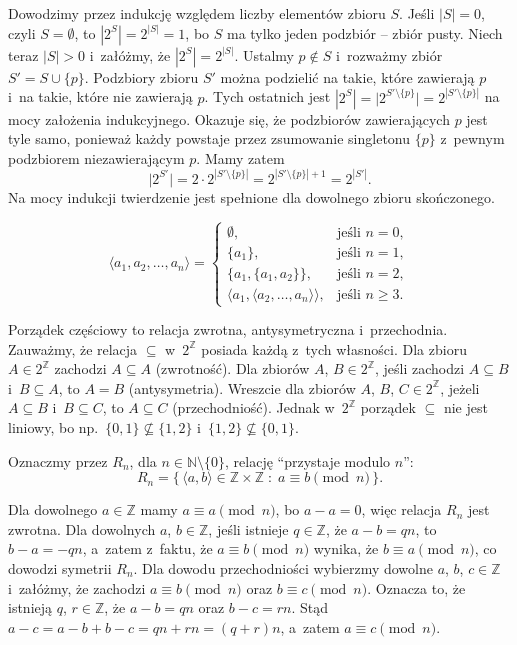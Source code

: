 \exercise %
Dowodzimy przez indukcję względem liczby elementów zbioru $S$. Jeśli $|S|=0$, czyli $S=\emptyset$, to $|2^S|=2^{|S|}=1$, bo $S$ ma tylko jeden podzbiór -- zbiór pusty. Niech teraz $|S|>0$ i~załóżmy, że $|2^S|=2^{|S|}$. Ustalmy $p\notin S$ i~rozważmy zbiór $S'=S\cup\{p\}$. Podzbiory zbioru $S'$ można podzielić na takie, które zawierają $p$ i~na takie, które nie zawierają $p$. Tych ostatnich jest $|2^S|=\bigl|2^{S'\setminus\{p\}}\bigr|=2^{|S'\setminus\{p\}|}$ na mocy założenia indukcyjnego. Okazuje się, że podzbiorów zawierających $p$ jest tyle samo, ponieważ każdy powstaje przez zsumowanie singletonu $\{p\}$ z~pewnym podzbiorem niezawierającym $p$. Mamy zatem
\[
	\bigl|2^{S'}\bigr|=2\cdot2^{|S'\setminus\{p\}|} = 2^{|S'\setminus\{p\}|+1} = 2^{|S'|}.
\]
Na mocy indukcji twierdzenie jest spełnione dla dowolnego zbioru skończonego.

\exercise %
\[
	\langle a_1,a_2,\dots,a_n\rangle =
	\begin{cases}
		\emptyset, & \text{jeśli $n=0$}, \\
		\{a_1\}, & \text{jeśli $n=1$}, \\
		\{a_1,\{a_1,a_2\}\}, & \text{jeśli $n=2$}, \\
		\langle a_1,\langle a_2,\dots,a_n\rangle\rangle, & \text{jeśli $n\ge3$}.
	\end{cases}
\]


\exercise %
Porządek częściowy to relacja zwrotna, antysymetryczna i~przechodnia. Zauważmy, że relacja $\subseteq$ w~$2^\mathbb{Z}$ posiada każdą z~tych własności. Dla zbioru $A\in2^\mathbb{Z}$ zachodzi $A\subseteq A$ (zwrotność). Dla zbiorów $A$, $B\in2^\mathbb{Z}$, jeśli zachodzi $A\subseteq B$ i~$B\subseteq A$, to $A=B$ (antysymetria). Wreszcie dla zbiorów $A$, $B$, $C\in2^\mathbb{Z}$, jeżeli $A\subseteq B$ i~$B\subseteq C$, to $A\subseteq C$ (przechodniość). Jednak w~$2^\mathbb{Z}$ porządek $\subseteq$ nie jest liniowy, bo np.\ $\{0,1\}\nsubseteq\{1,2\}$ i~$\{1,2\}\nsubseteq\{0,1\}$.

\exercise %
Oznaczmy przez $R_n$, dla $n\in\mathbb{N}\setminus\{0\}$, relację ``przystaje modulo $n$'':
\[
	R_n = \bigl\{\,\langle a,b\rangle\in\mathbb{Z}\times\mathbb{Z}\;:\;a\equiv b\!\!\!\pmod{n}\,\bigr\}.
\]

Dla dowolnego $a\in\mathbb{Z}$ mamy $a\equiv a\pmod{n}$, bo $a-a=0$, więc relacja $R_n$ jest zwrotna. Dla dowolnych $a$, $b\in\mathbb{Z}$, jeśli istnieje $q\in\mathbb{Z}$, że $a-b=qn$, to $b-a=-qn$, a~zatem z~faktu, że $a\equiv b\pmod{n}$ wynika, że $b\equiv a\pmod{n}$, co dowodzi symetrii $R_n$. Dla dowodu przechodniości wybierzmy dowolne $a$, $b$, $c\in\mathbb{Z}$ i~załóżmy, że zachodzi $a\equiv b\pmod{n}$ oraz $b\equiv c\pmod{n}$. Oznacza to, że istnieją $q$, $r\in\mathbb{Z}$, że $a-b=qn$ oraz $b-c=rn$. Stąd $a-c=a-b+b-c=qn+rn=(q+r)n$, a~zatem $a\equiv c\pmod{n}$.

